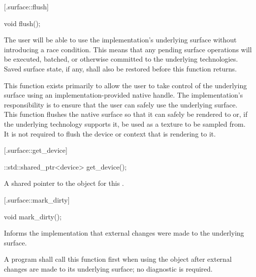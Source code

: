  [\iotwod.surface::flush] {}

%
%
\begin{itemdecl}
void flush();
\end{itemdecl}
\begin{itemdescr}
	\pnum
	\effects
	The user will be able to use the implementation's underlying surface without introducing a race condition. This means that any pending surface operations will be executed, batched, or otherwise committed to the underlying technologies. Saved surface state, if any, shall also be restored before this function returns.
	
	\pnum
	\remarks
	This function exists primarily to allow the user to take control of the 
	underlying surface using an implementation-provided native handle. The implementation's responsibility is to ensure that the user can safely use the underlying surface.
	\enternote
	This function flushes the native surface so that it can safely be rendered to or, if the underlying technology supports it, be used as a texture to be sampled from. It is not required to flush the device or context that is rendering to it.
	\exitnote
\end{itemdescr}

 [\iotwod.surface::get_device] {}

%
%
\begin{itemdecl}
::std::shared_ptr<device> get_device();
\end{itemdecl}
\begin{itemdescr}
	\pnum
	\returns
	A shared pointer to the  object for this .	
\end{itemdescr}

 [\iotwod.surface::mark_dirty] {}

%
%
\begin{itemdecl}
void mark_dirty();
\end{itemdecl}
\begin{itemdescr}
	\pnum
	\effects
	Informs the implementation that external changes were made to the underlying surface.
	
	\pnum
	\remarks
	A program shall call this function first when using the  object after external changes are made to its underlying surface; no diagnostic is required.
\end{itemdescr}


